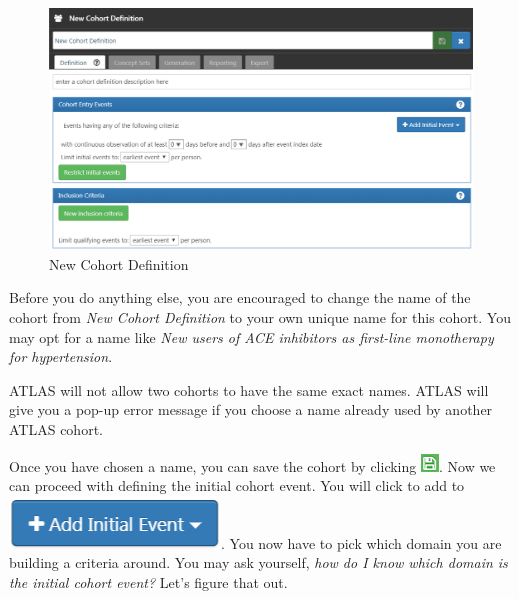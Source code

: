 \documentclass[11pt]{book}
\theoremstyle{definition}
\theoremstyle{definition}
\theoremstyle{definition}
\theoremstyle{remark}
\let\BeginKnitrBlock\begin \let\EndKnitrBlock\end
\begin{document}
\begin{figure}

{\centering \includegraphics[width=0.9\linewidth]{images/Cohorts/ATLAS-defineacohort} 

}

\caption{New Cohort Definition}\label{fig:ATLASdefineacohort}
\end{figure}

Before you do anything else, you are encouraged to change the name of the cohort from \emph{New Cohort Definition} to your own unique name for this cohort. You may opt for a name like \emph{New users of ACE inhibitors as first-line monotherapy for hypertension}.

\BeginKnitrBlock{rmdimportant}
ATLAS will not allow two cohorts to have the same exact names. ATLAS will give you a pop-up error message if you choose a name already used by another ATLAS cohort.
\EndKnitrBlock{rmdimportant}

Once you have chosen a name, you can save the cohort by clicking \includegraphics{images/Cohorts/save.png}. Now we can proceed with defining the initial cohort event. You will click to add to \includegraphics{images/Cohorts/initialevent.png}. You now have to pick which domain you are building a criteria around. You may ask yourself, \emph{how do I know which domain is the initial cohort event?} Let's figure that out.
\end{document}
